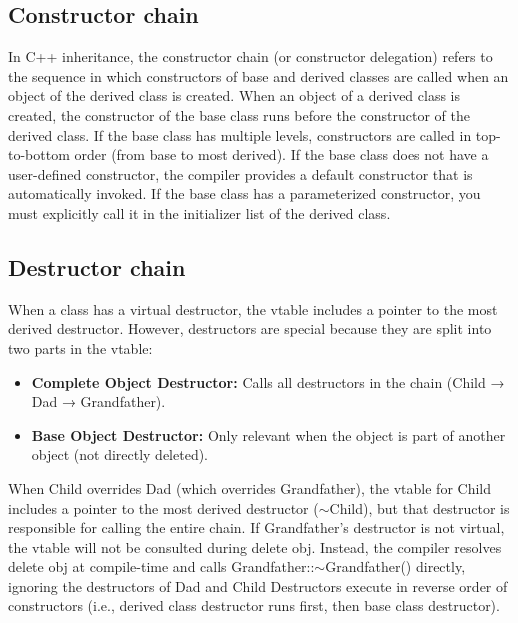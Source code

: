 \documentclass{report}
\begin{document}
    



    \pagebreak 
    \bigbreak \noindent 
    \subsection{Constructor chain}
    \bigbreak \noindent 
    In C++ inheritance, the constructor chain (or constructor delegation) refers to the sequence in which constructors of base and derived classes are called when an object of the derived class is created.
    \bigbreak \noindent 
    When an object of a derived class is created, the constructor of the base class runs before the constructor of the derived class.
    \bigbreak \noindent 
    If the base class has multiple levels, constructors are called in top-to-bottom order (from base to most derived).
    \bigbreak \noindent 
    If the base class does not have a user-defined constructor, the compiler provides a default constructor that is automatically invoked.
    \bigbreak \noindent 
    If the base class has a parameterized constructor, you must explicitly call it in the initializer list of the derived class.
    \bigbreak \noindent 
    \subsection{Destructor chain}
    \bigbreak \noindent 
    When a class has a virtual destructor, the vtable includes a pointer to the most derived destructor. However, destructors are special because they are split into two parts in the vtable:
    \begin{itemize}
        \item \textbf{Complete Object Destructor:} Calls all destructors in the chain (Child → Dad → Grandfather).
        \item \textbf{Base Object Destructor:} Only relevant when the object is part of another object (not directly deleted).
    \end{itemize}
    \bigbreak \noindent 
    When Child overrides Dad (which overrides Grandfather), the vtable for Child includes a pointer to the most derived destructor ($\sim$Child), but that destructor is responsible for calling the entire chain.
    \bigbreak \noindent 
    If Grandfather's destructor is not virtual, the vtable will not be consulted during delete obj. Instead, the compiler resolves delete obj at compile-time and calls Grandfather::$\sim$Grandfather() directly, ignoring the destructors of Dad and Child
    \bigbreak \noindent 
    Destructors execute in reverse order of constructors (i.e., derived class destructor runs first, then base class destructor).
\end{document}
